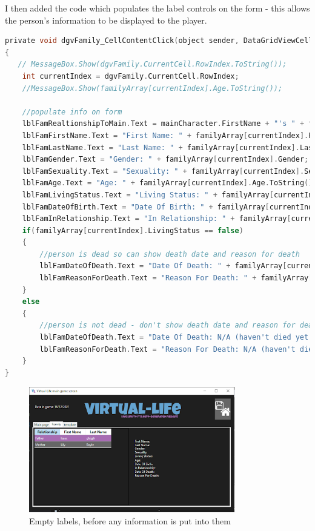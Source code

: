 \noindent I then added the code which populates the label controls on the form - this allows the person's information to be displayed to the player.
\begin{lstlisting}[language=c, style=csharp, caption=Code to populate labels on Family Tab containing information about the selected person]
private void dgvFamily_CellContentClick(object sender, DataGridViewCellEventArgs e)
{
   // MessageBox.Show(dgvFamily.CurrentCell.RowIndex.ToString());
    int currentIndex = dgvFamily.CurrentCell.RowIndex;
    //MessageBox.Show(familyArray[currentIndex].Age.ToString());

    //populate info on form
    lblFamRealtionshipToMain.Text = mainCharacter.FirstName + "'s " + familyArray[currentIndex].RelationshipToMain;
    lblFamFirstName.Text = "First Name: " + familyArray[currentIndex].FirstName;
    lblFamLastName.Text = "Last Name: " + familyArray[currentIndex].LastName;
    lblFamGender.Text = "Gender: " + familyArray[currentIndex].Gender;
    lblFamSexuality.Text = "Sexuality: " + familyArray[currentIndex].Sexuality;
    lblFamAge.Text = "Age: " + familyArray[currentIndex].Age.ToString();
    lblFamLivingStatus.Text = "Living Status: " + familyArray[currentIndex].LivingStatus.ToString();
    lblFamDateOfBirth.Text = "Date Of Birth: " + familyArray[currentIndex].DateOfBirth.ToShortDateString();
    lblFamInRelationship.Text = "In Relationship: " + familyArray[currentIndex].InRelationship.ToString();
    if(familyArray[currentIndex].LivingStatus == false)
    {
        //person is dead so can show death date and reason for death
        lblFamDateOfDeath.Text = "Date Of Death: " + familyArray[currentIndex].DateOfDeath.ToShortDateString();
        lblFamReasonForDeath.Text = "Reason For Death: " + familyArray[currentIndex].ReasonForDeath;
    }
    else
    {
        //person is not dead - don't show death date and reason for death
        lblFamDateOfDeath.Text = "Date Of Death: N/A (haven't died yet!)";
        lblFamReasonForDeath.Text = "Reason For Death: N/A (haven't died yet!)";
    }
}
\end{lstlisting}
\begin{figure}[H]
    \centering
    \includegraphics[width=0.8\textwidth]{images/implementation/familyTabLabelsPre.png}
    \caption{Empty labels, before any information is put into them}
    \label{fig:implementation-familyTabLabelsPre}
\end{figure}
